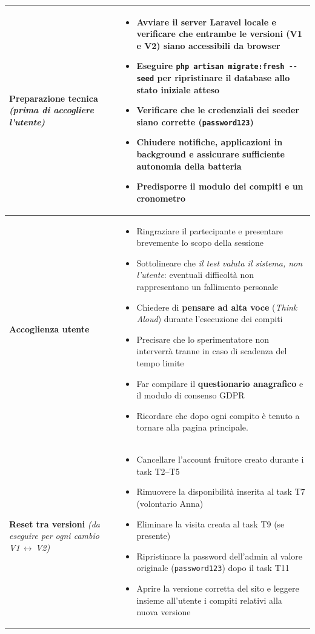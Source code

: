 \vspace{0.3cm}
\renewcommand{\arraystretch}{1.4}
\begin{tabularx}{\textwidth}{|p{3.5cm}|X|}
\hline
\textbf{Preparazione tecnica} \newline \textit{(prima di accogliere l'utente)} &
\begin{itemize}[leftmargin=*, nosep, topsep=2pt]
    \item Avviare il server Laravel locale e verificare che entrambe le versioni (V1 e V2) siano accessibili da browser
    \item Eseguire \texttt{php artisan migrate:fresh -{}-seed} per ripristinare il database allo stato iniziale atteso
    \item Verificare che le credenziali dei seeder siano corrette (\texttt{password123})
    \item Chiudere notifiche, applicazioni in background e assicurare sufficiente autonomia della batteria
    \item Predisporre il modulo dei compiti e un cronometro
\end{itemize} \\
\hline
\textbf{Accoglienza utente} &
\begin{itemize}[leftmargin=*, nosep, topsep=2pt]
    \item Ringraziare il partecipante e presentare brevemente lo scopo della sessione
    \item Sottolineare che \textit{il test valuta il sistema, non l'utente}: eventuali difficoltà non rappresentano un fallimento personale
    \item Chiedere di \textbf{pensare ad alta voce} (\textit{Think Aloud}) durante l'esecuzione dei compiti
    \item Precisare che lo sperimentatore non interverrà tranne in caso di scadenza del tempo limite
    \item Far compilare il \textbf{questionario anagrafico} e il modulo di consenso GDPR
    \item Ricordare che dopo ogni compito è tenuto a tornare alla pagina principale.
\end{itemize} \\
\hline
\textbf{Reset tra versioni} \newline \textit{(da eseguire per ogni cambio V1\,$\leftrightarrow$\,V2)} &
\begin{itemize}[leftmargin=*, nosep, topsep=2pt]
    \item Cancellare l'account fruitore creato durante i task T2--T5
    \item Rimuovere la disponibilità inserita al task T7 (volontario Anna)
    \item Eliminare la visita creata al task T9 (se presente)
    \item Ripristinare la password dell'admin al valore originale (\texttt{password123}) dopo il task T11
    \item Aprire la versione corretta del sito e leggere insieme all'utente i compiti relativi alla nuova versione
\end{itemize} \\
\hline
\end{tabularx}
\renewcommand{\arraystretch}{1}

